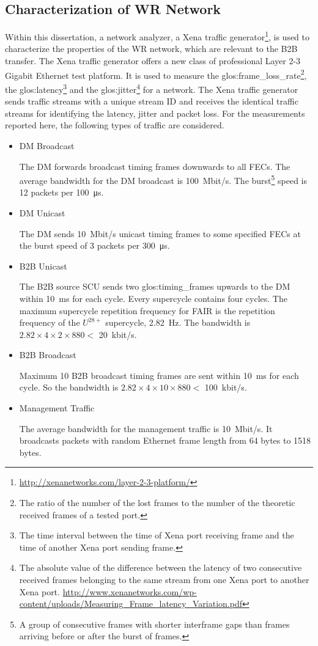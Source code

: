 \subsection{Characterization of WR Network}
Within this dissertation, a network analyzer, a Xena traffic generator\footnote{\url{http://xenanetworks.com/layer-2-3-platform/}}, is used to characterize the properties of the WR network, which are relevant to the B2B transfer. The Xena traffic generator offers a new class of professional Layer 2-3 Gigabit Ethernet test platform. It is used to measure the \gls{glos:frame_loss_rate}\footnote{The ratio of the number of the lost frames to the number of the theoretic received frames of a tested port.}, the \gls{glos:latency}\footnote{The time interval between the time of Xena port receiving frame and the time of another Xena port sending frame.} and the \gls{glos:jitter}\footnote{The absolute value of the difference between the latency of two consecutive received frames belonging to the same stream from one Xena port to another Xena port. \newline\url{http://www.xenanetworks.com/wp-content/uploads/Measuring_Frame_latency_Variation.pdf}} for a network. The Xena traffic generator sends traffic streams with a unique stream ID and receives the identical traffic streams for identifying the latency, jitter and packet loss. For the measurements reported here, the following types of traffic are considered.

\begin{itemize}
    \item DM Broadcast 

The DM forwards broadcast timing frames downwards to all FECs. The average bandwidth for the DM broadcast is \SI{100}{Mbit/s}. The burst\footnote{A group of consecutive frames with shorter interframe gaps than frames arriving before or after the burst of frames.} speed is 12 packets per \SI{100}{\micro\second}.
 		\item DM Unicast 

The DM sends \SI{10}{Mbit/s} unicast timing frames to some specified FECs at the burst speed of 3 packets per \SI{300}{\micro\second}.
	\item B2B Unicast

The B2B source SCU sends two \gls{glos:timing_frame}s upwards to the DM within \SI{10}{\ms} for each cycle. Every supercycle contains four cycles. The maximum supercycle repetition frequency for FAIR is the repetition frequency of the $U^{28+}$ supercycle, \SI{2.82}{\Hz}. The bandwidth is $2.82\times4\times2\times880<$ \SI{20}{kbit/s}. 
	\item B2B Broadcast

Maximum 10 B2B broadcast timing frames are sent within \SI{10}{\ms} for each cycle. So the bandwidth is $2.82\times4\times10\times880<$ \SI{100}{kbit/s}.

	\item Management Traffic

The average bandwidth for the management traffic is \SI{10}{Mbit/s}. It broadcasts packets with random Ethernet frame length from 64 bytes to 1518 bytes. 
\end{itemize}

